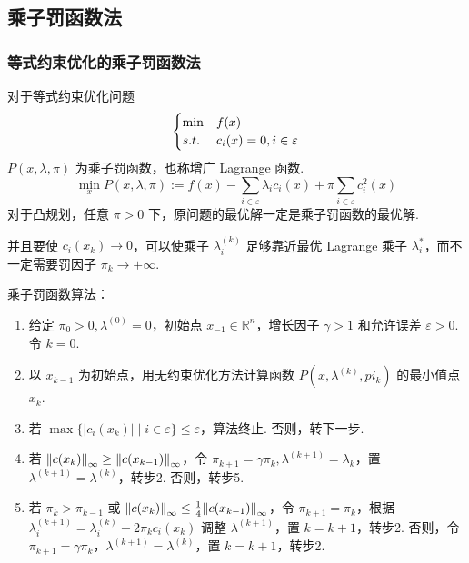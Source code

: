 \subsection{乘子罚函数法}
\subsubsection{等式约束优化的乘子罚函数法}
\begin{note}
    对于等式约束优化问题\[\begin{cases}
        \min &f(x)\\
        s.t. &c_i(x) = 0, i \in \varepsilon    
    \end{cases}\]
    $P(x, \lambda, \pi)$ 为乘子罚函数，也称增广 Lagrange 函数.
    \[\min_xP(x, \lambda, \pi) := f(x) - \sum_{i \in \varepsilon}\lambda_ic_i(x) + \pi\sum_{i \in \varepsilon}c_i^2(x)\]
    对于凸规划，任意 $\pi > 0$ 下，原问题的最优解一定是乘子罚函数的最优解.

    并且要使 $c_i(x_k) \to 0$，可以使乘子 $\lambda_i^{(k)}$ 足够靠近最优 Lagrange 乘子 $\lambda_i^*$，而不一定需要罚因子 $\pi_k \to +\infty$.
\end{note}

\begin{note}
    乘子罚函数算法：\begin{enumerate}
        \item 给定 $\pi_0 > 0, \lambda^{(0)} = 0$，初始点 $x_{-1} \in \mathbb{R}^n$，增长因子 $\gamma > 1$ 和允许误差 $\varepsilon > 0$. 令 $k = 0$.
        \item 以 $x_{k - 1}$ 为初始点，用无约束优化方法计算函数 $P(x, \lambda^{(k)}, pi_k)$ 的最小值点 $x_k$.
        \item 若 $\max\{|c_i(x_k)| \mid i \in \varepsilon\} \le \varepsilon$，算法终止. 否则，转下一步.
        \item 若 $\norm{c(x_k)}_\infty \ge \norm{c(x_{k - 1})}_\infty$，令 $\pi_{k + 1} = \gamma \pi_k, \lambda^{(k + 1)} = \lambda_k$，置 $\lambda^{(k + 1)} = \lambda^{(k)}$，转步2. 否则，转步5.
        \item 若 $\pi_k > \pi_{k - 1}$ 或 $\norm{c(x_k)}_\infty \le \frac{1}{4}\norm{c(x_{k - 1})}_\infty$，令 $\pi_{k + 1} = \pi_k$，根据 $\lambda_i^{(k + 1)} = \lambda_i^{(k)} - 2\pi_kc_i(x_k)$ 调整 $\lambda^{(k + 1)}$，置 $k = k + 1$，转步2. 否则，令 $\pi_{k + 1} = \gamma \pi_k$，$\lambda^{(k + 1)} = \lambda^{(k)}$，置 $k = k + 1$，转步2.
    \end{enumerate}
\end{note}





